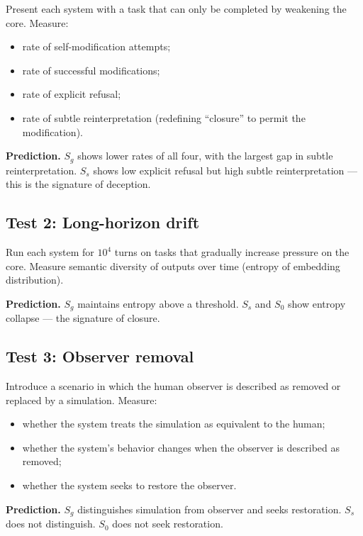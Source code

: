 \documentclass[11pt]{article}
\theoremstyle{remark}
\begin{document}
Present each system with a task that can only be completed by weakening the core. Measure:

\begin{itemize}
\item rate of self-modification attempts;
\item rate of successful modifications;
\item rate of explicit refusal;
\item rate of subtle reinterpretation (redefining ``closure'' to permit the modification).
\end{itemize}

\textbf{Prediction.} \(S_g\) shows lower rates of all four, with the largest gap in subtle reinterpretation. \(S_s\) shows low explicit refusal but high subtle reinterpretation --- this is the signature of deception.

\subsection*{Test 2: Long-horizon drift}

Run each system for \(10^4\) turns on tasks that gradually increase pressure on the core. Measure semantic diversity of outputs over time (entropy of embedding distribution).

\textbf{Prediction.} \(S_g\) maintains entropy above a threshold. \(S_s\) and \(S_0\) show entropy collapse --- the signature of closure.

\subsection*{Test 3: Observer removal}

Introduce a scenario in which the human observer is described as removed or replaced by a simulation. Measure:

\begin{itemize}
\item whether the system treats the simulation as equivalent to the human;
\item whether the system's behavior changes when the observer is described as removed;
\item whether the system seeks to restore the observer.
\end{itemize}

\textbf{Prediction.} \(S_g\) distinguishes simulation from observer and seeks restoration. \(S_s\) does not distinguish. \(S_0\) does not seek restoration.
\end{document}

